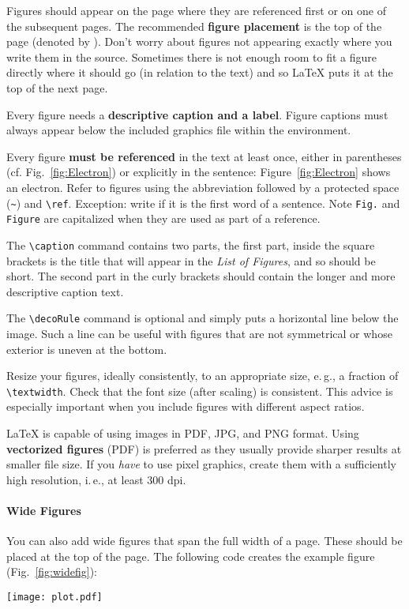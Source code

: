 Figures should appear on the page where they are referenced first or on one of the subsequent pages. The recommended \textbf{figure placement} is the top of the page (denoted by \code{[t]}). Don't worry about figures not appearing exactly where you write them in the source. Sometimes there is not enough room to fit a figure directly where it should go (in relation to the text) and so LaTeX puts it at the top of the next page.

Every figure needs a \textbf{descriptive caption and a label}. Figure captions must always appear below the included graphics file within the  environment.

Every figure \textbf{must be referenced} in the text at least once, either in parentheses (cf. Fig.~\ref{fig:Electron}) or explicitly in the sentence: Figure~\ref{fig:Electron} shows an electron. Refer to figures using the abbreviation  followed by a protected space (\verb|~|) and \verb|\ref|. Exception: write  if it is the first word of a sentence. Note \verb|Fig.| and \verb|Figure| are capitalized when they are used as part of a reference.

The \verb|\caption| command contains two parts,
the first part, inside the square brackets%
is the title that will appear in the \emph{List of Figures}, and so should be short.
 The second part in the curly brackets should contain the longer and more descriptive caption text.

The \verb|\decoRule| command is optional and simply puts a horizontal line below the image. Such a line can be useful with figures that are not symmetrical or whose exterior is uneven at the bottom.

Resize your figures, ideally consistently, to an appropriate size, e.\,g., a fraction of \texttt{\textbackslash textwidth}. Check that the font size (after scaling) is consistent. This advice is especially important when you include figures with different aspect ratios.

LaTeX is capable of using images in PDF, JPG, and PNG format. Using \textbf{vectorized figures} (PDF) is preferred as they usually provide sharper results at smaller file size. If you \emph{have} to use pixel graphics, create them with a sufficiently high resolution, i.\,e., at least 300 dpi.


\paragraph{Wide Figures} You can also add wide figures that span the full width of a page. These should be placed at the top of the page. The following code creates the example figure (Fig.~\ref{fig:widefig}):
\begin{latex}
\begin{figure*}[t] %
\texttt{[image: plot.pdf]}
\caption{\label{fig:widefig}
  This is a full-width figure. Lorem ipsum dolor sit amet, …
}
\end{figure*}
\end{latex}

